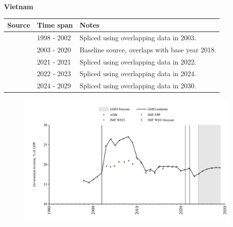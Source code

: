 \documentclass[12pt,a4paper,landscape]{article}
\begin{document}
\begin{adjustbox}{max totalsize={\paperwidth}{\paperheight},center}
\begin{minipage}[t][\textheight][t]{\textwidth}
\vspace*{0.5cm}
{}
\begin{center}
{\Large\bfseries Vietnam}
\end{center}
\vspace{0.5cm}
\begin{table}[H]
\centering
\small
\begin{tabular}{|l|l|l|}
\hline
\textbf{Source} & \textbf{Time span} & \textbf{Notes} \\
\hline
\rowcolor{white}\cite{IMF_WEO}& 1998 - 2002 &Spliced using overlapping data in 2003.\\
\rowcolor{lightgray}\cite{ADB}& 2003 - 2020 &Baseline source, overlaps with base year 2018.\\
\rowcolor{white}\cite{IMF_WEO}& 2021 - 2021 &Spliced using overlapping data in 2022.\\
\rowcolor{lightgray}\cite{IMF_FPP}& 2022 - 2023 &Spliced using overlapping data in 2024.\\
\rowcolor{white}\cite{IMF_WEO_forecast}& 2024 - 2029 &Spliced using overlapping data in 2030.\\
\hline
\end{tabular}
\end{table}
\begin{figure}[H]
\centering
\includegraphics[width=\textwidth,height=0.6\textheight,keepaspectratio]{graphs/VNM_govrev_GDP.pdf}
\end{figure}
\end{minipage}
\end{adjustbox}
\end{document}
